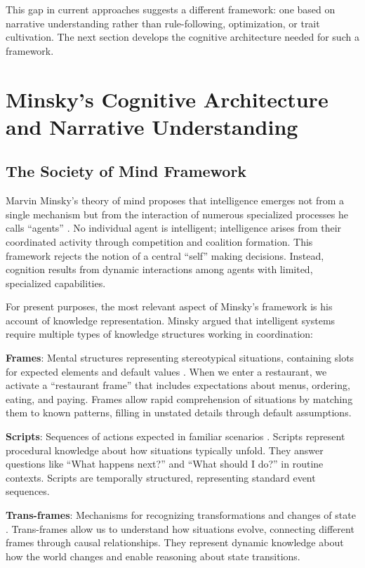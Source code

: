 \documentclass[12pt]{article}
\begin{document}
This gap in current approaches suggests a different framework: one based on narrative understanding rather than rule-following, optimization, or trait cultivation. The next section develops the cognitive architecture needed for such a framework.

\section{Minsky's Cognitive Architecture and Narrative Understanding}

\subsection{The Society of Mind Framework}

Marvin Minsky's theory of mind proposes that intelligence emerges not from a single mechanism but from the interaction of numerous specialized processes he calls ``agents'' \citep{minsky1986society}. No individual agent is intelligent; intelligence arises from their coordinated activity through competition and coalition formation. This framework rejects the notion of a central ``self'' making decisions. Instead, cognition results from dynamic interactions among agents with limited, specialized capabilities.

For present purposes, the most relevant aspect of Minsky's framework is his account of knowledge representation. Minsky argued that intelligent systems require multiple types of knowledge structures working in coordination:

\textbf{Frames}: Mental structures representing stereotypical situations, containing slots for expected elements and default values \citep{minsky1974framework}. When we enter a restaurant, we activate a ``restaurant frame'' that includes expectations about menus, ordering, eating, and paying. Frames allow rapid comprehension of situations by matching them to known patterns, filling in unstated details through default assumptions.

\textbf{Scripts}: Sequences of actions expected in familiar scenarios \citep{schank1977scripts}. Scripts represent procedural knowledge about how situations typically unfold. They answer questions like ``What happens next?'' and ``What should I do?'' in routine contexts. Scripts are temporally structured, representing standard event sequences.

\textbf{Trans-frames}: Mechanisms for recognizing transformations and changes of state \citep{minsky1986society}. Trans-frames allow us to understand how situations evolve, connecting different frames through causal relationships. They represent dynamic knowledge about how the world changes and enable reasoning about state transitions.
\end{document}
